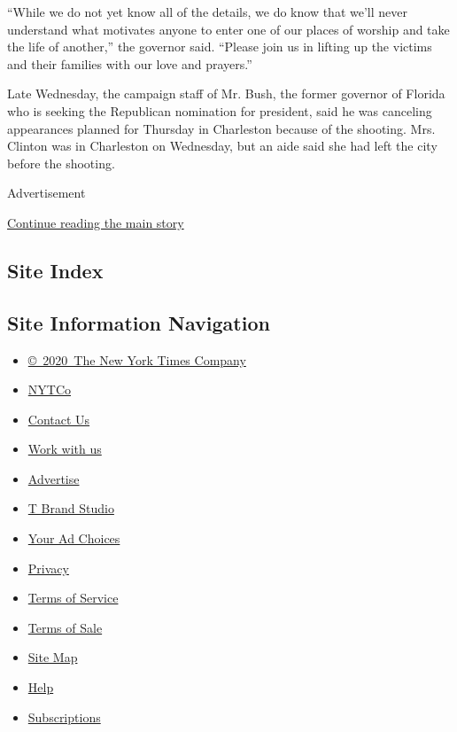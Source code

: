 ``While we do not yet know all of the details, we do know that we'll
never understand what motivates anyone to enter one of our places of
worship and take the life of another,'' the governor said. ``Please join
us in lifting up the victims and their families with our love and
prayers.''

Late Wednesday, the campaign staff of Mr. Bush, the former governor of
Florida who is seeking the Republican nomination for president, said he
was canceling appearances planned for Thursday in Charleston because of
the shooting. Mrs. Clinton was in Charleston on Wednesday, but an aide
said she had left the city before the shooting.

Advertisement

\protect\hyperlink{after-bottom}{Continue reading the main story}

\hypertarget{site-index}{%
\subsection{Site Index}\label{site-index}}

\hypertarget{site-information-navigation}{%
\subsection{Site Information
Navigation}\label{site-information-navigation}}

\begin{itemize}
\tightlist
\item
  \href{https://help.nytimes3xbfgragh.onion/hc/en-us/articles/115014792127-Copyright-notice}{©~2020~The
  New York Times Company}
\end{itemize}

\begin{itemize}
\tightlist
\item
  \href{https://www.nytco.com/}{NYTCo}
\item
  \href{https://help.nytimes3xbfgragh.onion/hc/en-us/articles/115015385887-Contact-Us}{Contact
  Us}
\item
  \href{https://www.nytco.com/careers/}{Work with us}
\item
  \href{https://nytmediakit.com/}{Advertise}
\item
  \href{http://www.tbrandstudio.com/}{T Brand Studio}
\item
  \href{https://www.nytimes3xbfgragh.onion/privacy/cookie-policy\#how-do-i-manage-trackers}{Your
  Ad Choices}
\item
  \href{https://www.nytimes3xbfgragh.onion/privacy}{Privacy}
\item
  \href{https://help.nytimes3xbfgragh.onion/hc/en-us/articles/115014893428-Terms-of-service}{Terms
  of Service}
\item
  \href{https://help.nytimes3xbfgragh.onion/hc/en-us/articles/115014893968-Terms-of-sale}{Terms
  of Sale}
\item
  \href{https://spiderbites.nytimes3xbfgragh.onion}{Site Map}
\item
  \href{https://help.nytimes3xbfgragh.onion/hc/en-us}{Help}
\item
  \href{https://www.nytimes3xbfgragh.onion/subscription?campaignId=37WXW}{Subscriptions}
\end{itemize}
